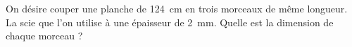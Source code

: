 On désire couper une planche de 124~cm en trois morceaux de même
longueur. La scie que l'on utilise à une épaisseur de 2~mm. Quelle
est la dimension de chaque morceau ?
